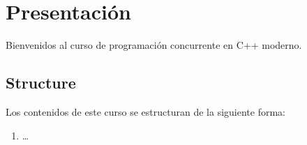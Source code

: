 \chapter*{Presentación}

Bienvenidos al curso de programación concurrente en C++ moderno.


\section*{Structure}

Los contenidos de este curso se estructuran de la siguiente forma:

\begin{enumerate}

\item \ldots

\end{enumerate}
